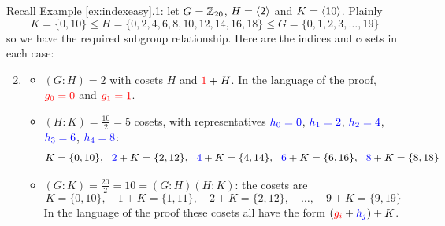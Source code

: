 \begin{examples}{}{}
\exstart Recall Example \ref{ex:indexeasy}.1: let $G=\mathbb{Z}_{20}$, $H=\left\langle 2\right\rangle$ and $K=\left\langle 10\right\rangle$. Plainly
	\[K=\{0,10\}\le H=\{0,2,4,6,8,10,12,14,16,18\}\le G=\{0,1,2,3,\ldots,19\}\]
	so we have the required subgroup relationship. Here are the indices and cosets in each case:
	
\begin{enumerate}\setcounter{enumi}{1}
  \item[]\begin{itemize}
	  \item $(G:H)=2$ with cosets $H$ and $\textcolor{red}{1}+H$. In the language of the proof, $\textcolor{red}{g_0=0}$ and $\textcolor{red}{g_1=1}$.
	  \item $(H:K)=\frac{10}{2}=5$ cosets, with representatives $\textcolor{blue}{h_0=0}$, $\textcolor{blue}{h_1=2}$, $\textcolor{blue}{h_2=4}$, $\textcolor{blue}{h_3=6}$, $\textcolor{blue}{h_4=8}$:
		\[K=\{0,10\},\ \ \textcolor{blue}{2}+K=\{2,12\},\ \ \textcolor{blue}{4}+K=\{4,14\},\ \ \textcolor{blue}{6}+K=\{6,16\},\ \ \textcolor{blue}{8}+K=\{8,18\}\]
		\item $(G:K)=\frac{20}{2}=10=(G:H)(H:K)$: the cosets are
		\[K=\{0,10\},\quad 1+K=\{1,11\},\quad 2+K=\{2,12\},\quad \ldots ,\quad 9+K=\{9,19\}\]
		In the language of the proof these cosets all have the form $(\textcolor{red}{g_i}+\textcolor{blue}{h_j})+K$.
	\end{itemize}


\end{enumerate}
\end{examples}
